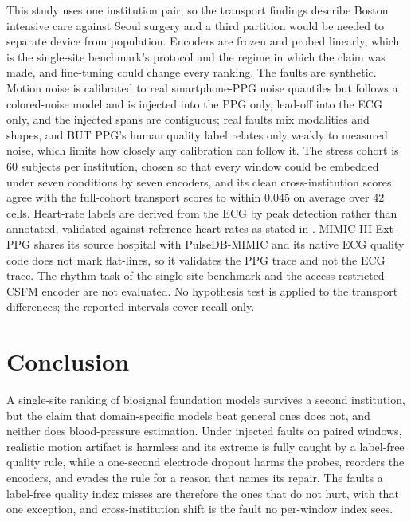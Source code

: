 \documentclass[pmlr,twocolumn,10pt]{jmlr}
\begin{document}
This study uses one institution pair, so the transport findings describe Boston intensive care against Seoul surgery and a third partition would be needed to separate device from population. Encoders are frozen and probed linearly, which is the single-site benchmark's protocol and the regime in which the claim was made, and fine-tuning could change every ranking. The faults are synthetic. Motion noise is calibrated to real smartphone-PPG noise quantiles but follows a colored-noise model and is injected into the PPG only, lead-off into the ECG only, and the injected spans are contiguous; real faults mix modalities and shapes, and BUT PPG's human quality label relates only weakly to measured noise, which limits how closely any calibration can follow it. The stress cohort is 60 subjects per institution, chosen so that every window could be embedded under seven conditions by seven encoders, and its clean cross-institution scores agree with the full-cohort transport scores to within 0.045 on average over 42 cells. Heart-rate labels are derived from the ECG by peak detection rather than annotated, validated against reference heart rates as stated in . MIMIC-III-Ext-PPG shares its source hospital with PulseDB-MIMIC and its native ECG quality code does not mark flat-lines, so it validates the PPG trace and not the ECG trace. The rhythm task of the single-site benchmark and the access-restricted CSFM encoder are not evaluated. No hypothesis test is applied to the transport differences; the reported intervals cover recall only.

\section{Conclusion}
\label{sec:conclusion}

A single-site ranking of biosignal foundation models survives a second institution, but the claim that domain-specific models beat general ones does not, and neither does blood-pressure estimation. Under injected faults on paired windows, realistic motion artifact is harmless and its extreme is fully caught by a label-free quality rule, while a one-second electrode dropout harms the probes, reorders the encoders, and evades the rule for a reason that names its repair. The faults a label-free quality index misses are therefore the ones that do not hurt, with that one exception, and cross-institution shift is the fault no per-window index sees.

\end{document}
